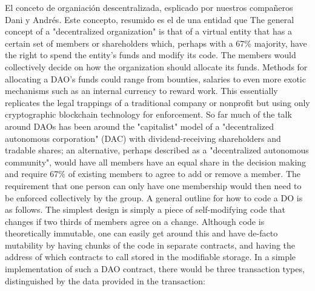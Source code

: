 \documentclass[11pt,a4paper]{article}
\begin{document}
El conceto de organiación descentralizada, esplicado por nuestros compañeros Dani y Andrés. Este concepto, resumido es el de una entidad que 
The general concept of a "decentralized organization" is that of a virtual entity that has a certain set of
members or shareholders which, perhaps with a 67\% majority, have the right to spend the entity's funds and
modify its code. The members would collectively decide on how the organization should allocate its funds.
Methods for allocating a DAO's funds could range from bounties, salaries to even more exotic mechanisms
such as an internal currency to reward work. This essentially replicates the legal trappings of a traditional
company or nonprofit but using only cryptographic blockchain technology for enforcement. So far much of the
talk around DAOs has been around the "capitalist" model of a "decentralized autonomous corporation" (DAC)
with dividend-receiving shareholders and tradable shares; an alternative, perhaps described as a
"decentralized autonomous community", would have all members have an equal share in the decision
making and require 67\% of existing members to agree to add or remove a member. The requirement that one
person can only have one membership would then need to be enforced collectively by the group.
A general outline for how to code a DO is as follows. The simplest design is simply a piece of self-modifying
code that changes if two thirds of members agree on a change. Although code is theoretically immutable, one
can easily get around this and have de-facto mutability by having chunks of the code in separate contracts,
and having the address of which contracts to call stored in the modifiable storage. In a simple
implementation of such a DAO contract, there would be three transaction types, distinguished by the data
provided in the transaction:
\end{document}
